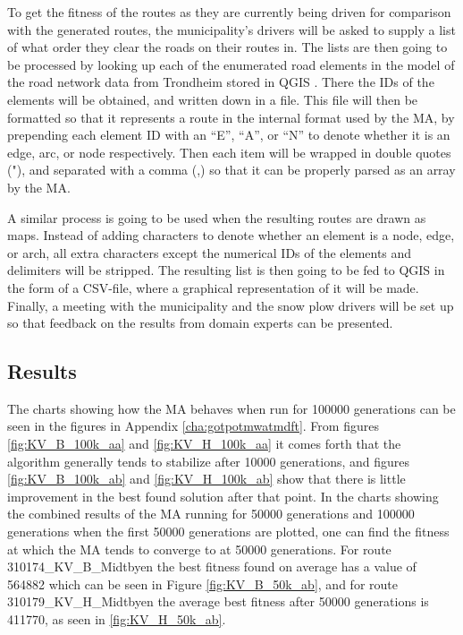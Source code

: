 To get the fitness of the routes as they are currently being driven for comparison with the generated routes, the municipality's drivers will be asked to supply a list of what order they clear the roads on their routes in. The lists are then going to be processed by looking up each of the enumerated road elements in the model of the road network data from Trondheim stored in QGIS \citep{QGISHomepage}. There the IDs of the elements will be obtained, and written down in a file. This file will then be formatted so that it represents a route in the internal format used by the MA, by prepending each element ID with an \enquote{E}, \enquote{A}, or \enquote{N} to denote whether it is an edge, arc, or node respectively. Then each item will be wrapped in double quotes ("), and separated with a comma (,) so that it can be properly parsed as an array by the MA.

A similar process is going to be used when the resulting routes are drawn as maps. Instead of adding characters to denote whether an element is a node, edge, or arch, all extra characters except the numerical IDs of the elements and delimiters will be stripped. The resulting list is then going to be fed to QGIS in the form of a CSV-file, where a graphical representation of it will be made. Finally, a meeting with the municipality and the snow plow drivers will be set up so that feedback on the results from domain experts can be presented.

\subsection{Results}



The charts showing how the MA behaves when run for 100000 generations can be seen in the figures in Appendix \ref{cha:gotpotmwatmdft}. From figures \ref{fig:KV_B_100k_aa} and \ref{fig:KV_H_100k_aa} it comes forth that the algorithm generally tends to stabilize after 10000 generations, and figures \ref{fig:KV_B_100k_ab} and \ref{fig:KV_H_100k_ab} show that there is little improvement in the best found solution after that point. In the charts showing the combined results of the MA running for 50000 generations and 100000 generations when the first 50000 generations are plotted, one can find the fitness at which the MA tends to converge to at 50000 generations. For route 310174\_KV\_B\_Midtbyen the best fitness found on average has a value of 564882 which can be seen in Figure \ref{fig:KV_B_50k_ab}, and for route 310179\_KV\_H\_Midtbyen the average best fitness after 50000 generations is 411770, as seen in \ref{fig:KV_H_50k_ab}.

